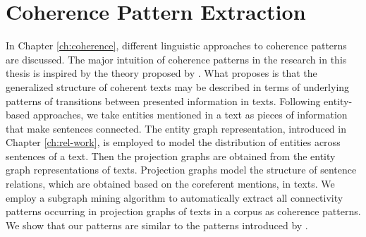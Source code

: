 \section{Coherence Pattern Extraction}
\label{sec:pattern-extraction}

In Chapter \ref{ch:coherence}, different linguistic approaches to coherence patterns are discussed. 
The major intuition of coherence patterns in the research in this thesis is inspired by the theory proposed by . 
What  proposes is that the generalized structure of coherent texts may be described in terms of underlying patterns of transitions between presented information in texts.  
Following entity-based approaches, we take entities mentioned in a text as pieces of information that make sentences connected. 
The entity graph representation, introduced in Chapter \ref{ch:rel-work}, is employed to model the distribution of entities across sentences of a text. 
Then the projection graphs are obtained from the entity graph representations of texts. 
Projection graphs model the structure of sentence relations, which are obtained based on the coreferent mentions, in texts. 
We employ a subgraph mining algorithm to automatically extract all connectivity patterns occurring in projection graphs of texts in a corpus as coherence patterns. 
We show that our patterns are similar to the patterns introduced by . 



